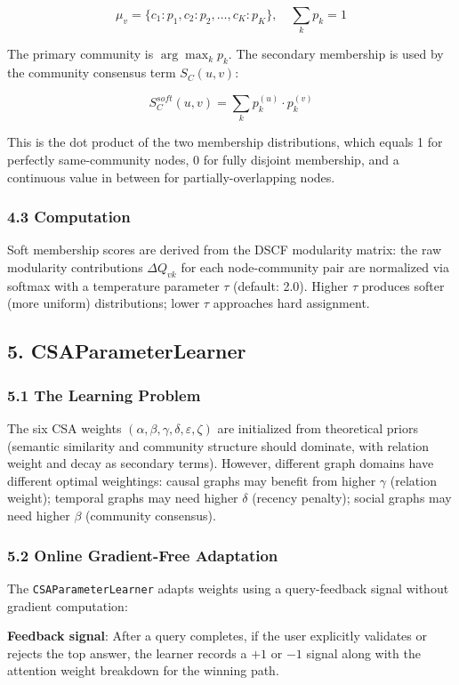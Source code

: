 $$\mu_v = \{c_1: p_1, c_2: p_2, \ldots, c_K: p_K\}, \quad \sum_k p_k = 1$$

The primary community is $\arg\max_k p_k$. The secondary membership is used by the community consensus term $S_C(u,v)$:

$$S_C^{soft}(u,v) = \sum_{k} p_k^{(u)} \cdot p_k^{(v)}$$

This is the dot product of the two membership distributions, which equals 1 for perfectly same-community nodes, 0 for fully disjoint membership, and a continuous value in between for partially-overlapping nodes.

\subsubsection*{4.3 Computation}
Soft membership scores are derived from the DSCF modularity matrix: the raw modularity contributions $\Delta Q_{vk}$ for each node-community pair are normalized via softmax with a temperature parameter $\tau$ (default: 2.0). Higher $\tau$ produces softer (more uniform) distributions; lower $\tau$ approaches hard assignment.

\subsection*{5. CSAParameterLearner}

\subsubsection*{5.1 The Learning Problem}
The six CSA weights $(\alpha, \beta, \gamma, \delta, \varepsilon, \zeta)$ are initialized from theoretical priors (semantic similarity and community structure should dominate, with relation weight and decay as secondary terms). However, different graph domains have different optimal weightings: causal graphs may benefit from higher $\gamma$ (relation weight); temporal graphs may need higher $\delta$ (recency penalty); social graphs may need higher $\beta$ (community consensus).

\subsubsection*{5.2 Online Gradient-Free Adaptation}
The \texttt{CSAParameterLearner} adapts weights using a query-feedback signal without gradient computation:

\textbf{Feedback signal}: After a query completes, if the user explicitly validates or rejects the top answer, the learner records a $+1$ or $-1$ signal along with the attention weight breakdown for the winning path.

